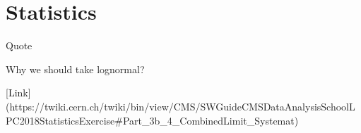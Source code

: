\chapter{Statistics}

Quote

Why we should take lognormal?

[Link](https://twiki.cern.ch/twiki/bin/view/CMS/SWGuideCMSDataAnalysisSchoolLPC2018StatisticsExercise#Part_3b_4_CombinedLimit_Systemat)

